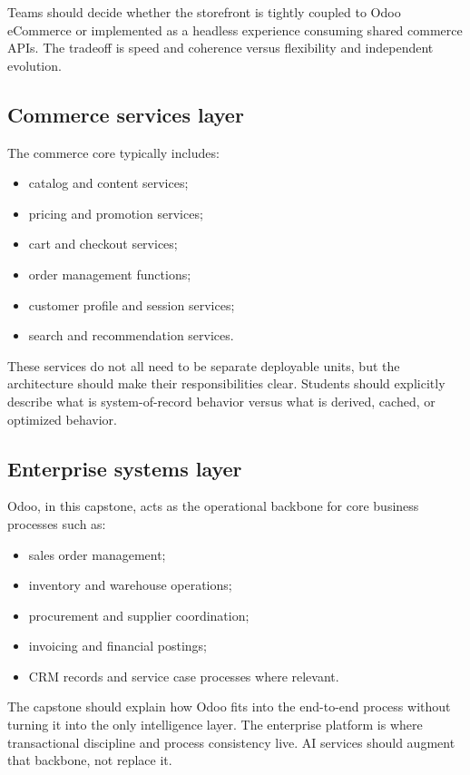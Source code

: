 Teams should decide whether the storefront is tightly coupled to Odoo eCommerce or implemented as a headless experience consuming shared commerce APIs. The tradeoff is speed and coherence versus flexibility and independent evolution.

\subsection{Commerce services layer}
The commerce core typically includes:
\begin{itemize}
  \item catalog and content services;
  \item pricing and promotion services;
  \item cart and checkout services;
  \item order management functions;
  \item customer profile and session services;
  \item search and recommendation services.
\end{itemize}

These services do not all need to be separate deployable units, but the architecture should make their responsibilities clear. Students should explicitly describe what is system-of-record behavior versus what is derived, cached, or optimized behavior.

\subsection{Enterprise systems layer}
Odoo, in this capstone, acts as the operational backbone for core business processes such as:
\begin{itemize}
  \item sales order management;
  \item inventory and warehouse operations;
  \item procurement and supplier coordination;
  \item invoicing and financial postings;
  \item CRM records and service case processes where relevant.
\end{itemize}

The capstone should explain how Odoo fits into the end-to-end process without turning it into the only intelligence layer. The enterprise platform is where transactional discipline and process consistency live. AI services should augment that backbone, not replace it.

